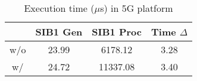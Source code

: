 \begin{table}[t]
    \centering
    \begin{tabular}{|c|c|c|c|}
    \hline
                    &  SIB1 Gen & SIB1 Proc & Time $\Delta$\\
    \hline
    w/o \scheme{}   & 23.99 & 6178.12 & 3.28 \\
    \hline
    w/ \scheme{}    & 24.72 & 11337.08 & 3.40 \\
    \hline
    \end{tabular}
    \caption{Execution time ($\mu$s) in 5G platform}
    \label{tab:OAI_eval}
\end{table}